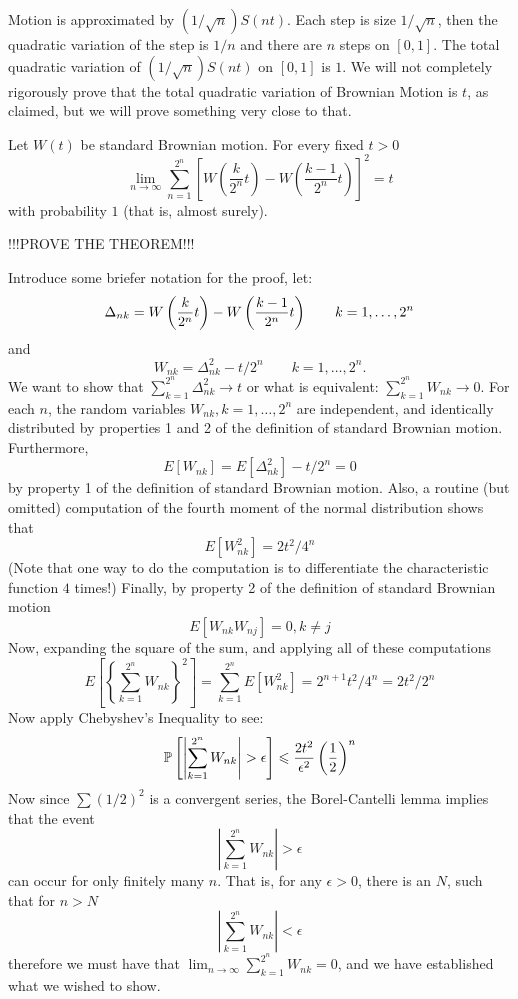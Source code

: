 \begin{problem}
  Motion is approximated by $(1/\sqrt{n}) S(nt)$.  Each step is size $1/\sqrt{n}$, 
  then the quadratic variation of the step is $1/n$ and there are $n$ steps on $[0,1]$.  
  The total quadratic variation of $(1/\sqrt{n})S(nt)$ on $[0,1]$ is $1$.
  We will not completely rigorously prove that the total quadratic variation of
  Brownian Motion is $t$, as claimed, but we will prove something very
  close to that.
  \begin{theorem}
  Let $W(t)$ be standard Brownian motion.  For every fixed $t > 0$
  \[
    \lim_{n \to \infty}
             \sum_{n=1}^{2^n} 
               \left[ 
                  W\left( \frac{k}{2^n} t \right) - 
                  W\left( \frac{k-1}{2^n} t \right)
               \right]^2
           = t
  \]
  \ni with probability $1$ (that is, almost surely).
  \end{theorem}
  !!!PROVE THE THEOREM!!!

\end{problem} 
\begin{solution} 
  Introduce some briefer notation for the proof, let:
  \[
    \Dt_{nk} = 
                  W\left( \frac{k}{2^n} t \right) -
                  W\left( \frac{k-1}{2^n} t \right)
          \qquad k = 1, \ldots, 2^n
  \]
  and
  \[
    W_{nk} = \Delta^{2}_{nk} - t/2^n \qquad k = 1, \ldots, 2^n.
  \]
  We want to show that $\sum_{k=1}^{2^n} \Delta^2_{nk} \to t$ or what
  is equivalent: $\sum_{k=1}^{2^n} W_{nk} \to 0$.  For each $n$, the
  random variables $W_{nk}, k = 1, \ldots, 2^n$ are independent, and
  identically distributed by properties 1 and 2 of the definition of
  standard Brownian motion.  Furthermore,
  \[
    E[ W_{nk} ] = E[ \Delta_{nk}^2 ] - t/2^n = 0
  \]
  by property 1 of the definition of standard Brownian motion.  Also, a
 routine (but omitted) 
  computation of the fourth moment of the normal distribution
  shows that
  \[
    E[W^2_{nk} ] = 2t^2/4^n
  \]
  (Note that one way to do the computation is to differentiate the
  characteristic function $4$ times!)
  Finally, by property 2 of the definition of standard Brownian motion
  \[
    E[ W_{nk}W_{nj} ] = 0, k \ne j
  \]
  Now, expanding the square of the sum, and applying all of these
  computations
  $$
    E\left[ \left\{ \sum_{k=1}^{2^n} W_{nk} \right\}^2 \right] =
    \sum_{k=1}^{2^n} E[W^2_{nk}] = 2^{n+1}t^2/4^n = 2t^2/2^n
  $$
  Now apply Chebyshev's Inequality to see:
  $$
    \P\left[ \left| \sum_{k=1}^{2^n} W_{nk} \right| > \epsilon \right]
     \le \frac{2 t^2}{\epsilon^2} \left( \frac{1}{2}
    \right)^n
  $$
  Now since $\sum (1/2)^2$ is a convergent series, the Borel-Cantelli
  lemma implies that the event
  $$
    \left| \sum_{k=1}^{2^n} W_{nk} \right| > \epsilon
  $$
  can occur for only finitely many $n$.  That is, for any $\epsilon >
  0$, there is an $N$, such that for $n > N$
  $$
    \left| \sum_{k=1}^{2^n} W_{nk} \right| < \epsilon
  $$
  therefore we must have that 
  $\lim_{n \to \infty} \sum_{k=1}^{2^n} W_{nk} = 0$, 
  and we have established what we
  wished to show.
\end{solution}

